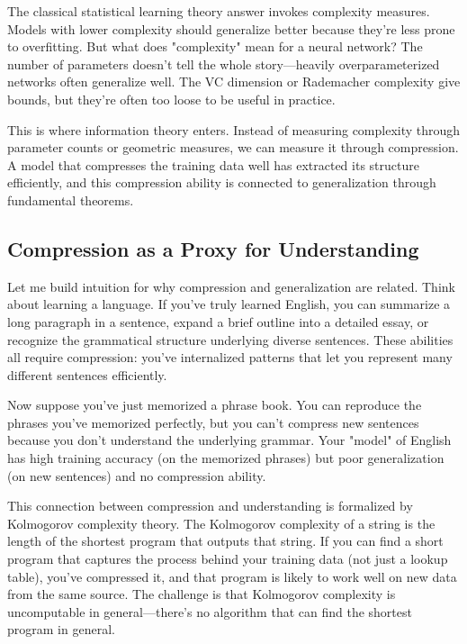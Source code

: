 \vspace{0.3cm}

The classical statistical learning theory answer invokes complexity measures. Models with lower complexity should generalize better because they're less prone to overfitting. But what does "complexity" mean for a neural network? The number of parameters doesn't tell the whole story---heavily overparameterized networks often generalize well. The VC dimension or Rademacher complexity give bounds, but they're often too loose to be useful in practice.

\vspace{0.3cm}

This is where information theory enters. Instead of measuring complexity through parameter counts or geometric measures, we can measure it through compression. A model that compresses the training data well has extracted its structure efficiently, and this compression ability is connected to generalization through fundamental theorems.

\vspace{1em}

\subsection{Compression as a Proxy for Understanding}

Let me build intuition for why compression and generalization are related. Think about learning a language. If you've truly learned English, you can summarize a long paragraph in a sentence, expand a brief outline into a detailed essay, or recognize the grammatical structure underlying diverse sentences. These abilities all require compression: you've internalized patterns that let you represent many different sentences efficiently.

\vspace{0.3cm}

Now suppose you've just memorized a phrase book. You can reproduce the phrases you've memorized perfectly, but you can't compress new sentences because you don't understand the underlying grammar. Your "model" of English has high training accuracy (on the memorized phrases) but poor generalization (on new sentences) and no compression ability.

\vspace{0.3cm}

This connection between compression and understanding is formalized by Kolmogorov complexity theory. The Kolmogorov complexity of a string is the length of the shortest program that outputs that string. If you can find a short program that captures the process behind your training data (not just a lookup table), you've compressed it, and that program is likely to work well on new data from the same source. The challenge is that Kolmogorov complexity is uncomputable in general---there's no algorithm that can find the shortest program in general.

